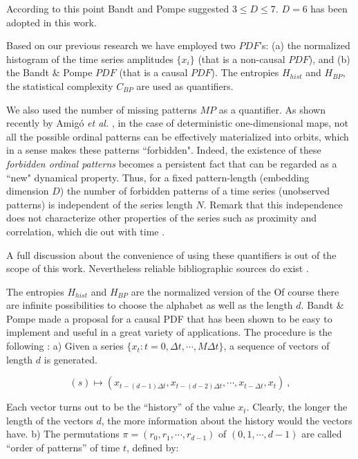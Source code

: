 According to this point Bandt and Pompe suggested $3\leq D \leq
7$. $D=6$ has been adopted in this work.

Based on our previous research \cite{DeMicco2008,DeMicco2009} we have employed two $PDF$'s: (a) the normalized histogram of the time series amplitudes $\{x_i\}$ (that is a non-causal $PDF$), and (b) the Bandt \& Pompe $PDF$ (that is a causal $PDF$).
The entropies $H_{hist}$ and $H_{BP}$, the statistical complexity $C_{BP}$  are used as quantifiers.  

We also used the number of missing patterns $MP$ as a quantifier\cite{Rosso2012}. As shown recently by Amig\'o {\it et al.\/}
\cite{Amigo2006,Amigo2007,Amigo2008,Amigo2010},  in the case of
deterministic one-dimensional maps, not all the possible ordinal patterns
can be effectively materialized into orbits, which in a sense
makes these patterns ``forbidden". Indeed, the existence of these
{\it forbidden ordinal patterns\/} becomes a persistent fact that
can be regarded as a ``new" dynamical property. Thus, for a fixed
pattern-length (embedding dimension $D$) the number of forbidden
patterns of a time series (unobserved patterns) is independent of
the series length $N$. Remark that this independence does not
characterize other properties of the series such as proximity and
correlation, which die out with time \cite{Amigo2007,Amigo2010}.

A full discussion about the convenience of using these quantifiers is
out of the scope of this work. Nevertheless reliable bibliographic
sources do exist
\cite{Wackerbauer1994,Lopez1995,Rosso2007A,DeMicco2008,Rosso2009,Martin2006,Rosso2012}.

The entropies $H_{hist}$ and $H_{BP}$ are the normalized version of the  Of course there are infinite possibilities to choose the alphabet as well as the length $d$.
Bandt \& Pompe made a proposal for a causal PDF that has been shown to be easy to implement and useful in a great variety of applications.  The procedure is the
following \cite{Pompe2002,Keller2003,Keller2005}: a) Given a
series $\{x_t : t=0, \Delta t, \cdots,M\Delta t \}$, a sequence of
vectors of length $d$ is generated.

\begin{equation}
\label{eq:vectores}
(s)\mapsto \left(x_{t-(d-1)\Delta t},x_{t-(d-2)\Delta t},\cdots,x_{t-\Delta t},x_{t}\right) \ ,
\end{equation}

Each vector turns out to be the ``history'' of the value $x_t$.
Clearly, the longer the length of the vectors $d$, the more
information about the history would the vectors have. b) The
permutations $\pi=(r_0, r_1, \cdots, r_{d-1})$ of $(0, 1, \cdots,
d-1)$ are called ``order of patterns'' of time $t$, defined by:

